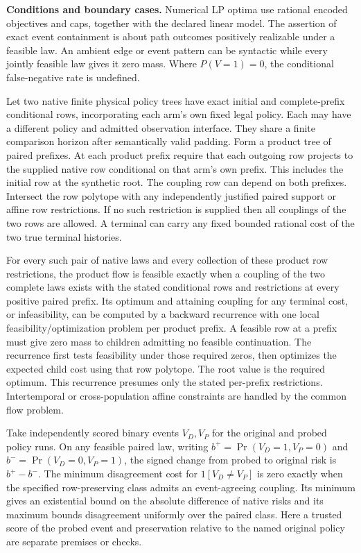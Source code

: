 \begin{theorem}
\textbf{Conditions and boundary cases.} Numerical LP optima use rational encoded objectives and caps, together with the declared linear model. The assertion of exact event containment is about path outcomes positively realizable under a feasible law. An ambient edge or event pattern can be syntactic while every jointly feasible law gives it zero mass. Where \(P(V=1)=0\), the conditional false-negative rate is undefined.

\end{theorem}

\begin{theorem}\label{ext:t26c}

Let two native finite physical policy trees have exact initial and complete-prefix conditional rows, incorporating each arm's own fixed legal policy. Each may have a different policy and admitted observation interface. They share a finite comparison horizon after semantically valid padding. Form a product tree of paired prefixes. At each product prefix require that each outgoing row projects to the supplied native row conditional on that arm's own prefix. This includes the initial row at the synthetic root. The coupling row can depend on both prefixes. Intersect the row polytope with any independently justified paired support or affine row restrictions. If no such restriction is supplied then all couplings of the two rows are allowed. A terminal can carry any fixed bounded rational cost of the two true terminal histories.

For every such pair of native laws and every collection of these product row restrictions, the product flow is feasible exactly when a coupling of the two complete laws exists with the stated conditional rows and restrictions at every positive paired prefix. Its optimum and attaining coupling for any terminal cost, or infeasibility, can be computed by a backward recurrence with one local feasibility/optimization problem per product prefix. A feasible row at a prefix must give zero mass to children admitting no feasible continuation. The recurrence first tests feasibility under those required zeros, then optimizes the expected child cost using that row polytope. The root value is the required optimum. This recurrence presumes only the stated per-prefix restrictions. Intertemporal or cross-population affine constraints are handled by the common flow problem.

Take independently scored binary events \(V_D,V_P\) for the original and probed policy runs. On any feasible paired law, writing \(b^+=\Pr(V_D=1,V_P=0)\) and \(b^-=\Pr(V_D=0,V_P=1)\), the signed change from probed to original risk is \(b^+-b^-\). The minimum disagreement cost for \(1[V_D\ne V_P]\) is zero exactly when the specified row-preserving class admits an event-agreeing coupling. Its minimum gives an existential bound on the absolute difference of native risks and its maximum bounds disagreement uniformly over the paired class. Here a trusted score of the probed event and preservation relative to the named original policy are separate premises or checks.


\end{theorem}

